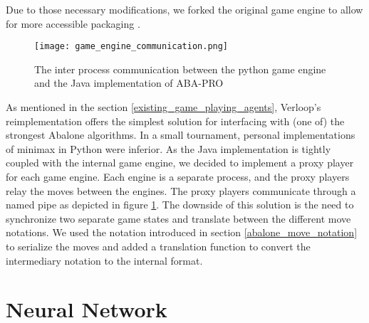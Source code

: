 Due to those necessary modifications, we forked the original game engine to allow for more accessible packaging \cite{claussen_campfiremanabalone-boai_2021}.

\begin{figure}
    \centering
    \texttt{[image: game\_engine\_communication.png]}
    \caption{The inter process communication between the python game engine and the Java implementation of ABA-PRO}
    \label{python_java_ipc}
\end{figure}

As mentioned in the section \ref{existing_game_playing_agents}, Verloop's reimplementation \cite{verloop_abaloneai_nodate} offers the simplest solution for interfacing with (one of) the strongest Abalone algorithms. In a small tournament, personal implementations of minimax in Python \cite{claussen_abalone_2021} were inferior. As the Java implementation is tightly coupled with the internal game engine, we decided to implement a proxy player for each game engine. Each engine is a separate process, and the proxy players relay the moves between the engines. The proxy players communicate through a named pipe as depicted in figure \ref{python_java_ipc}. The downside of this solution is the need to synchronize two separate game states and translate between the different move notations. We used the notation introduced in section \ref{abalone_move_notation} to serialize the moves and added a translation function to convert the intermediary notation to the internal format.

\section{Neural Network}
